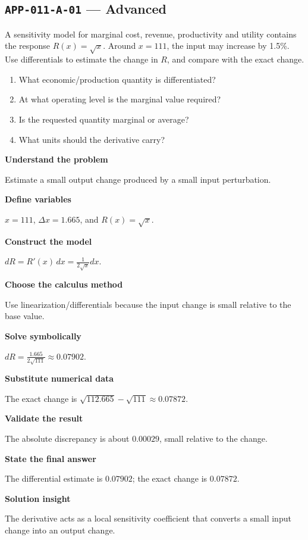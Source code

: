 \documentclass[11pt]{book}
\newcommand{\pid}[1]{\texttt{#1}}
\begin{document}
\subsection*{\pid{APP-011-A-01} — Advanced}
\begin{problembox}
A sensitivity model for marginal cost, revenue, productivity and utility contains the response $R(x)=\sqrt{x}$. Around $x=111$, the input may increase by 1.5\%. Use differentials to estimate the change in $R$, and compare with the exact change.
\end{problembox}
\begin{promptbox}\begin{enumerate}
\item What economic/production quantity is differentiated?
\item At what operating level is the marginal value required?
\item Is the requested quantity marginal or average?
\item What units should the derivative carry?
\end{enumerate}\end{promptbox}
\begin{solutionbox}
\textbf{Understand the problem}\par Estimate a small output change produced by a small input perturbation.\par\medskip
\textbf{Define variables}\par $x=111$, $\Delta x=1.665$, and $R(x)=\sqrt x$.\par\medskip
\textbf{Construct the model}\par $dR=R'(x)\,dx=\frac{1}{2\sqrt{x}}dx$.\par\medskip
\textbf{Choose the calculus method}\par Use linearization/differentials because the input change is small relative to the base value.\par\medskip
\textbf{Solve symbolically}\par $dR=\frac{1.665}{2\sqrt{111}}\approx 0.07902$.\par\medskip
\textbf{Substitute numerical data}\par The exact change is $\sqrt{112.665}-\sqrt{111}\approx 0.07872$.\par\medskip
\textbf{Validate the result}\par The absolute discrepancy is about $0.00029$, small relative to the change.\par\medskip
\textbf{State the final answer}\par The differential estimate is $0.07902$; the exact change is $0.07872$.\par\medskip
\textbf{Solution insight}\par The derivative acts as a local sensitivity coefficient that converts a small input change into an output change.\par\medskip
\end{solutionbox}
\end{document}
